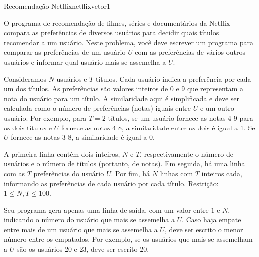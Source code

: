 \documentclass[12pt,a4paper,oneside]{article}
\begin{document}
\begin{problem}{Recomendação Netflix}{netflixvetor}{1}

O programa de recomendação de filmes, séries e documentários da Netflix compara as preferências de diversos usuários para decidir quais títulos recomendar a um usuário. Neste problema, você deve escrever um programa para comparar as preferências de um usuário $U$ com as preferências de vários outros usuários e informar qual usuário mais se assemelha a $U$.

Consideramos $N$ usuários e $T$ títulos. Cada usuário indica a preferência por cada um dos títulos. As preferências são valores inteiros de 0 e 9 que representam a nota do usuário para um título. A similaridade aqui é simplificada e deve ser calculada como o número de preferências (notas) iguais entre $U$ e um outro usuário. Por exemplo, para $T = 2$ títulos, se um usuário fornece as notas 4 9 para os dois títulos e $U$ fornece as notas 4 8, a similaridade entre os dois é igual a 1. Se $U$ fornece as notas 3 8, a similaridade é igual a 0.



\InputFile

A primeira linha contém dois inteiros, $N$ e $T$, respectivamente o número de usuários e o número de títulos (portanto, de notas). Em seguida, há uma linha com as $T$ preferências do usuário $U$. Por fim, há $N$ linhas com $T$ inteiros cada, informando as preferências de cada usuário por cada título. Restrição: $1 \leq N, T \leq 100$.

\OutputFile

Seu programa gera apenas uma linha de saída, com um valor entre $1$ e $N$, indicando o número do usuário que mais se assemelha a $U$. Caso haja empate entre mais de um usuário que mais se assemelha a $U$, deve ser escrito o menor número entre os empatados. Por exemplo, se os usuários que mais se assemelham a $U$ são os usuários 20 e 23, deve ser escrito 20.


\Example

\begin{example}
%
\end{example}

\begin{example}
%
\end{example}

\begin{example}
%
\end{example}

\end{problem}
\end{document}
